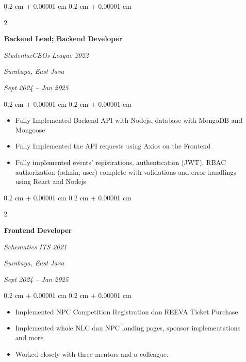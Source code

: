 \documentclass[10pt, letterpaper]{article}
\newenvironment{highlights}{
    \begin{itemize}[
        topsep=0.10 cm,
        parsep=0.10 cm,
        partopsep=0pt,
        itemsep=0pt,
        leftmargin=0.4 cm + 10pt
    ]
}{
    \end{itemize}
} %
\newenvironment{onecolentry}{
    \begin{adjustwidth}{
        0.2 cm + 0.00001 cm
    }{
        0.2 cm + 0.00001 cm
    }
}{
    \end{adjustwidth}
} %
\newenvironment{twocolentry}[2][]{
    \onecolentry
    \def\secondColumn{#2}
    \setcolumnwidth{\fill, 4.5 cm}
    \begin{paracol}{2}
}{
    \switchcolumn \raggedleft \secondColumn
    \end{paracol}
    \endonecolentry
} %
\begin{document}
        \begin{twocolentry}{
        \textit{Surabaya, East Java}    
            
        \textit{Sept 2024 – Jan 2025}}
            \textbf{Backend Lead; Backend Developer}
            
            \textit{StudentsxCEOs League 2022}
        \end{twocolentry}

        \vspace{0.10 cm}
        \begin{onecolentry}
            \begin{highlights}
                \item Fully Implemented Backend API with Nodejs, database with MongoDB and Mongoose
                \item Fully Implemented the API requests using Axios on the Frontend
                \item Fully implemented events' registrations, authentication (JWT), RBAC authorization (admin, user) complete with validations and error handlings using React and Nodejs
            \end{highlights}
        \end{onecolentry}

        \vspace{0.2 cm}

        \begin{twocolentry}{
        \textit{Surabaya, East Java}    
            
        \textit{Sept 2024 – Jan 2025}}
            \textbf{Frontend Developer}
            
            \textit{Schematics ITS 2021}
        \end{twocolentry}

        \vspace{0.10 cm}
        \begin{onecolentry}
            \begin{highlights}
                \item Implemented NPC Competition Registration dan REEVA Ticket Purchase
                \item Implemented whole NLC dan NPC landing pages, sponsor implementations and more
                \item Worked closely with three mentors and a colleague.
            \end{highlights}
        \end{onecolentry}
\end{document}
